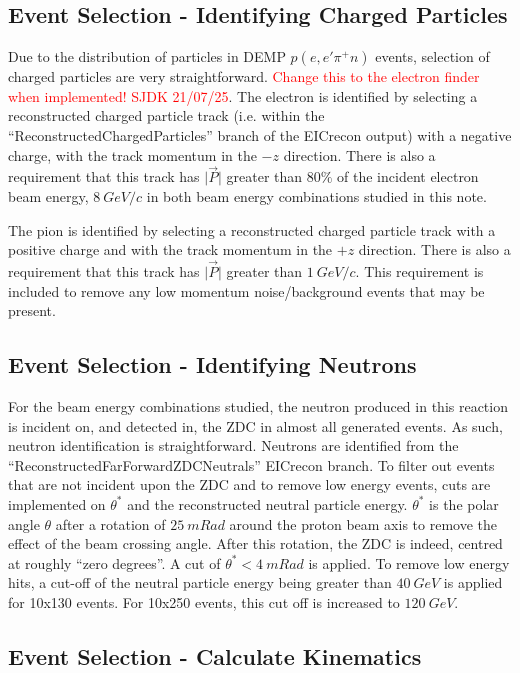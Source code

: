 \documentclass[letterpaper,12pt]{article}
\begin{document}
\subsection{Event Selection - Identifying Charged Particles}\label{subsec:Charged_Parts}

Due to the distribution of particles in DEMP $p(e,e'\pi^+n)$ events, selection of charged particles are very straightforward. \textcolor{red}{Change this to the electron finder when implemented! SJDK 21/07/25}. The electron is identified by selecting a reconstructed charged particle track (i.e. within the ``ReconstructedChargedParticles'' branch of the EICrecon output) with a negative charge, with the track momentum in the $-z$ direction. There is also a requirement that this track has $\lvert \vec{P} \rvert$ greater than $80\%$ of the incident electron beam energy, $8~GeV/c$ in both beam energy combinations studied in this note. 

The pion is identified by selecting a reconstructed charged particle track with a positive charge and with the track momentum in the $+z$ direction. There is also a requirement that this track has $\lvert \vec{P} \rvert$ greater than $1~GeV/c$. This requirement is included to remove any low momentum noise/background events that may be present.

\subsection{Event Selection - Identifying Neutrons}\label{subsec:Neutrons}

For the beam energy combinations studied, the neutron produced in this reaction is incident on, and detected in, the ZDC in almost all generated events. As such, neutron identification is straightforward. Neutrons are identified from the ``ReconstructedFarForwardZDCNeutrals'' EICrecon branch. To filter out events that are not incident upon the ZDC and to remove low energy events, cuts are implemented on $\theta^{*}$ and the reconstructed neutral particle energy. $\theta^{*}$ is the polar angle $\theta$ after a rotation of $25~mRad$ around the proton beam axis to remove the effect of the beam crossing angle. After this rotation, the ZDC is indeed, centred at roughly ``zero degrees''. A cut of $\theta^{*}<4~mRad$ is applied. To remove low energy hits, a cut-off of the neutral particle energy being greater than $40~GeV$ is applied for 10x130 events. For 10x250 events, this cut off is increased to $120~GeV$.

\subsection{Event Selection - Calculate Kinematics}\label{subsec:Kinematic_Calcs}
\end{document}
